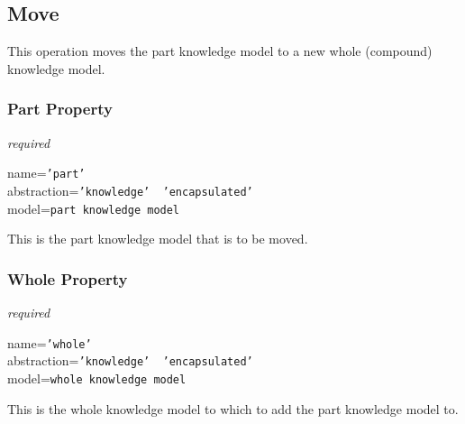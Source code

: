 %
%
%
%
%
%

\subsection{Move}
\label{move_heading}

This operation moves the part knowledge model to a new whole (compound)
knowledge model.

\subsubsection{Part Property}

\emph{required}

name=\texttt{'part'}\\
abstraction=\texttt{'knowledge' \vline\ 'encapsulated'}\\
model=\texttt{part knowledge model}

This is the part knowledge model that is to be moved.

\subsubsection{Whole Property}

\emph{required}

name=\texttt{'whole'}\\
abstraction=\texttt{'knowledge' \vline\ 'encapsulated'}\\
model=\texttt{whole knowledge model}

This is the whole knowledge model to which to add the part knowledge model to.
